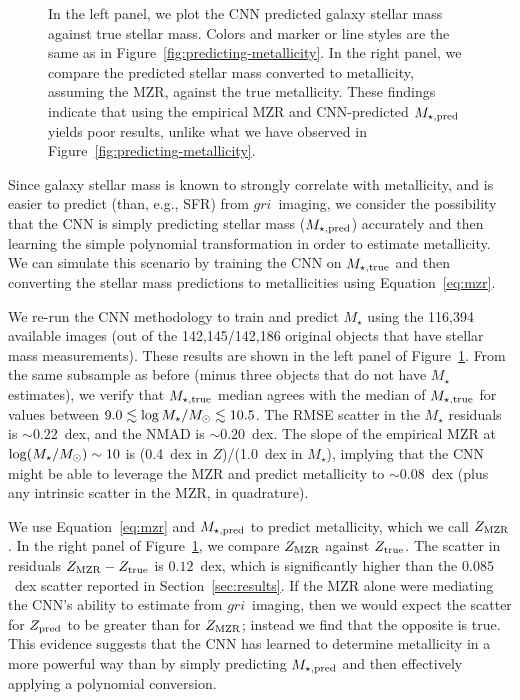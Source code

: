 \documentclass[fleqn,usenatbib]{mnras}
\newcommand{\sdssg}{\hbox{$g$}}
\newcommand{\sdssr}{\hbox{$r$}}
\newcommand{\sdssi}{\hbox{$i$}}
\newcommand{\mstar}{\hbox{$M_{\star}$}}
\newcommand{\msol}{\hbox{$M_\odot$}}
\newcommand{\eg}{e.g.}
\begin{document}
\begin{figure}
	\caption{\label{fig:mass-metallicity}
		In the left panel, we plot the CNN predicted galaxy stellar mass against true stellar mass. Colors and marker or line styles are the same as in Figure~\ref{fig:predicting-metallicity}. In the right panel, we compare the predicted stellar mass converted to metallicity, assuming the \citet{Tremonti2004} MZR, against the true metallicity.
		These findings indicate that using the empirical MZR and CNN-predicted $M_{\star,\rm pred}$ yields poor results, unlike what we have observed in Figure~\ref{fig:predicting-metallicity}.
		}
\end{figure}

Since galaxy stellar mass is known to strongly correlate with metallicity, and is easier to predict (than, \eg, SFR) from \sdssg\sdssr\sdssi\ imaging, we consider the possibility that the CNN is simply predicting stellar mass ($M_{\star,\rm pred}$) accurately and then learning the simple polynomial transformation in order to estimate metallicity. We can simulate this scenario by training the CNN on $M_{\star, \rm true}$ and then converting the stellar mass predictions to metallicities using Equation~\ref{eq:mzr}.

We re-run the CNN methodology to train and predict $M_{\star}$ using the 116,394 available images (out of the 142,145/142,186 original objects that have stellar mass measurements). These results are shown in the left panel of Figure~\ref{fig:mass-metallicity}. From the same subsample as before (minus three objects that do not have \mstar estimates), we verify that $M_{\rm \star, true}$ median agrees with the median of $M_{\rm \star, true}$ for values between $9.0 \lesssim \log \mstar /\msol \lesssim 10.5$. The RMSE scatter in the \mstar{} residuals is $\sim 0.22$~dex, and the NMAD is $\sim 0.20$~dex. The slope of the empirical MZR at $\log (\mstar / \msol) \sim 10$ is (0.4~dex in $Z$)/(1.0~dex in \mstar), implying that the CNN might be able to leverage the MZR and predict metallicity to $\sim 0.08$~dex (plus any intrinsic scatter in the MZR, in quadrature).

We use Equation~\ref{eq:mzr} and $M_{\star,\rm pred}$ to predict metallicity, which we call $Z_{\rm MZR}$. In the right panel of Figure~\ref{fig:mass-metallicity}, we compare $Z_{\rm MZR}$ against $Z_{\rm true}$. The scatter in residuals $Z_{\rm MZR} - Z_{\rm true}$ is $0.12$~dex, which is significantly higher than the $0.085$~dex scatter reported in Section~\ref{sec:results}. If the MZR alone were mediating the CNN's ability to estimate from
\sdssg\sdssr\sdssi\ imaging, then we would expect the scatter for $Z_{\rm pred}$ to be greater than for $Z_{\rm MZR}$; instead we find that the opposite is true. This evidence suggests that the CNN has learned to determine metallicity in a more powerful way than by simply predicting $M_{\rm \star,pred}$ and then effectively applying a polynomial conversion.
\end{document}
